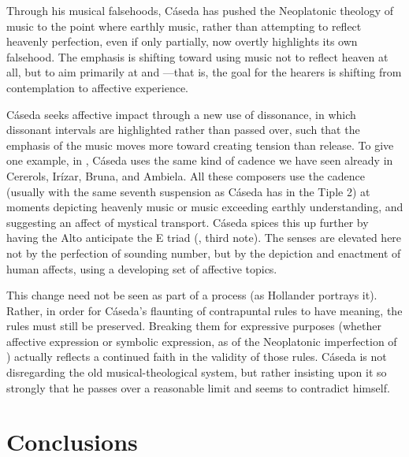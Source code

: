 Through his musical falsehoods, Cáseda has pushed the Neoplatonic theology of music to the point where earthly music, rather than attempting to reflect heavenly perfection, even if only partially, now overtly highlights its own falsehood.
The emphasis is shifting toward using music not to reflect heaven at all, but to aim primarily at  and ---that is, the goal for the hearers is shifting from contemplation to affective experience.

Cáseda seeks affective impact through a new use of dissonance, in which dissonant intervals are highlighted rather than passed over, such that the emphasis of the music moves more toward creating tension than release.
To give one example, in , Cáseda uses the same kind of  cadence we have seen already in Cererols, Irízar, Bruna, and Ambiela.  %
All these composers use the cadence (usually with the same seventh suspension as Cáseda has in the Tiple 2) at moments depicting heavenly music or music exceeding earthly understanding, and suggesting an affect of mystical transport.
Cáseda spices this up further by having the Alto anticipate the E\fl{} triad (, third note).
The senses are elevated here not by the perfection of sounding number, but by the depiction and enactment of human affects, using a developing set of affective topics.

This change need not be seen as part of a  process (as Hollander portrays it).
Rather, in order for Cáseda's flaunting of contrapuntal rules to have meaning, the rules must still be preserved.
Breaking them for expressive purposes (whether affective expression or symbolic expression, as of the Neoplatonic imperfection of ) actually reflects a continued faith in the validity of those rules.
Cáseda is not disregarding the old musical-theological system, but rather insisting upon it so strongly that he passes over a reasonable limit and seems to contradict himself.

\section{Conclusions}

